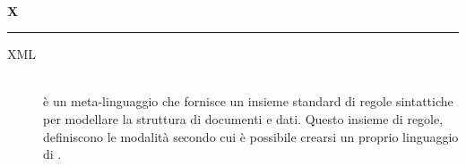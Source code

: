 \documentclass[12pt,a4paper]{article}
\begin{document}
\newpage

\begin{center}
\hfill\\
	\LARGE \textbf{X}
\hfill\\
\rule[15pt]{30pt}{0.5pt}
\end{center}

\begin{description}
\item[XML] 
\hfill\\è un meta-linguaggio che fornisce un insieme standard di regole sintattiche per modellare la struttura di documenti e dati. Questo insieme di regole, definiscono le modalità secondo cui è possibile crearsi un proprio linguaggio di  .
\end{description}
\end{document}
